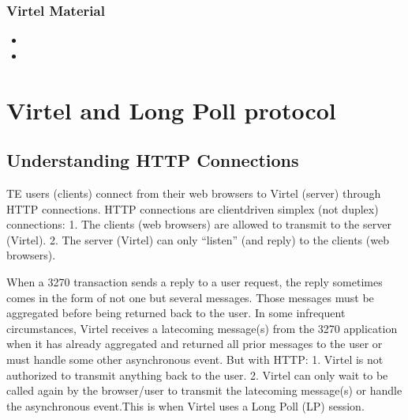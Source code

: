 \documentclass[letterpaper,10pt,english]{sphinxmanual}
\begin{document}
\subsection{Virtel Material}
\label{\detokenize{connectivity_guide:virtel-material}}\begin{itemize}
\item {} 
\sphinxAtStartPar
{}

\item {} 
\sphinxAtStartPar
{}

\end{itemize}

\ignorespaces 

\chapter{Virtel and Long Poll protocol}
\label{\detokenize{connectivity_guide:virtel-and-long-poll-protocol}}\label{\detokenize{connectivity_guide:index-163}}

\section{Understanding HTTP Connections}
\label{\detokenize{connectivity_guide:understanding-http-connections}}
 TE users (clients) connect from their web browsers to Virtel (server) through HTTP connections. HTTP connections are client\sphinxhyphen{}driven simplex (not duplex) connections:
1.      The clients (web browsers) are allowed to transmit to the server (Virtel).
2.      The server (Virtel) can only “listen” (and reply) to the clients (web browsers).

\sphinxAtStartPar
When a 3270 transaction sends a reply to a user request, the reply sometimes comes in the form of not one but several messages. Those messages must be aggregated before being returned back to the user. In some infrequent circumstances, Virtel receives a late\sphinxhyphen{}coming message(s) from the 3270 application when it has already aggregated and returned all prior messages to the user or must handle some other asynchronous event. But with HTTP:
1.      Virtel is not authorized to transmit anything back to the user.
2.      Virtel can only wait to be called again by the browser/user to transmit the late\sphinxhyphen{}coming message(s) or handle the asynchronous event.This is when Virtel uses a Long Poll (LP) session.
\end{document}

